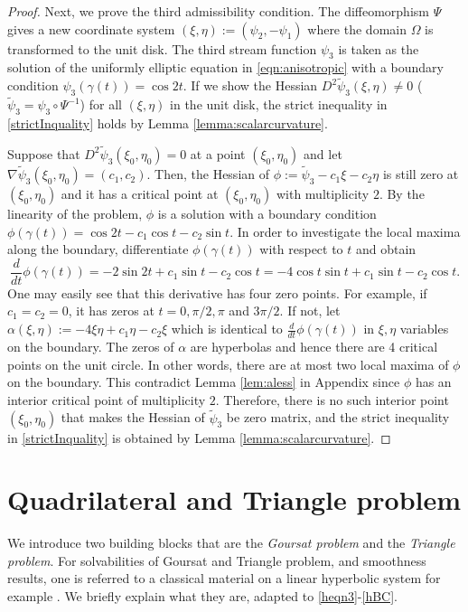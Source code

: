 \documentclass[11pt]{amsart}
\theoremstyle{plain}
\theoremstyle{remark}
\newtheorem{Rem}[Thm]{Remark}
\numberwithin{equation}{section}
\numberwithin{Thm}{section}
\begin{document}
\begin{proof}
Next, we prove the third admissibility condition. The diffeomorphism $\Psi$ gives a new coordinate system $(\xi,\eta):=(\psi_2,-\psi_1)$ where the domain $\Omega$ is  transformed to the unit disk. The third stream function $\psi_3$ is taken as the solution of the uniformly elliptic equation in \eqref{eqn:anisotropic} with a boundary condition $\psi_3(\gamma(t))=\cos 2t$. If we show the Hessian $D^2\tilde{\psi}_3(\xi,\eta)\ne0$ ($\tilde{\psi}_3 = \psi_3 \circ \Psi^{-1}$) for all $(\xi,\eta)$ in the unit disk, the strict inequality in \eqref{strictInquality} holds by Lemma \ref{lemma:scalarcurvature}.

Suppose that $D^2\tilde{\psi}_3(\xi_0,\eta_0)=0$ at a point $(\xi_0,\eta_0)$ and let $\nabla \tilde{\psi}_3 (\xi_0,\eta_0) = (c_1,c_2)$. Then, the Hessian of $\phi:=\tilde{\psi}_3 - c_1\xi - c_2\eta$ is still zero at $(\xi_0,\eta_0)$ and it has a critical point at $(\xi_0,\eta_0)$ with multiplicity $2$. By the linearity of the problem, $\phi$ is a solution with a boundary condition $\phi(\gamma(t)) = \cos 2t - c_1\cos t - c_2\sin t$. In order to investigate the local maxima along the boundary, differentiate $\phi(\gamma(t))$ with respect to $t$ and obtain
$$
{\frac{d}{dt}}\phi(\gamma(t))= -2\sin 2t + c_1\sin t - c_2\cos t =-4\cos t  \sin  t  + c_1\sin t  - c_2\cos t .
$$
One may easily see that this derivative has four zero points. For example, if $c_1=c_2=0$, it has zeros at $t=0,{\pi/2},\pi$ and $3\pi/2$. If not, let $\alpha(\xi,\eta):=-4\xi\eta + c_1\eta-c_2\xi$ which is identical to ${\frac{d}{dt}}\phi(\gamma(t))$ in $\xi,\eta$ variables on the boundary. The zeros of $\alpha$ are hyperbolas and hence there are 4 critical points on the unit circle. In other words, there are at most two local maxima of $\phi$ on the boundary. This contradict Lemma \ref{lem:aless} in Appendix since $\phi$ has an interior critical point of multiplicity $2$. Therefore, there is no such interior point $(\xi_0,\eta_0)$ that makes the Hessian of $\tilde{\psi}_3$ be zero matrix, and the strict inequality in \eqref{strictInquality} is obtained by Lemma \ref{lemma:scalarcurvature}.
\end{proof}




\section{Quadrilateral and Triangle problem} \label{local}
We introduce two building blocks that are the {\it Goursat problem} and the {\it Triangle problem}. For solvabilities of Goursat and Triangle problem, and smoothness results, one is referred to a classical material on a linear hyperbolic system for example \cite[Chapter V. Section 6]{CH_2008}. We briefly explain what they are, adapted to \eqref{heqn3}-\eqref{hBC}.
\end{document}
